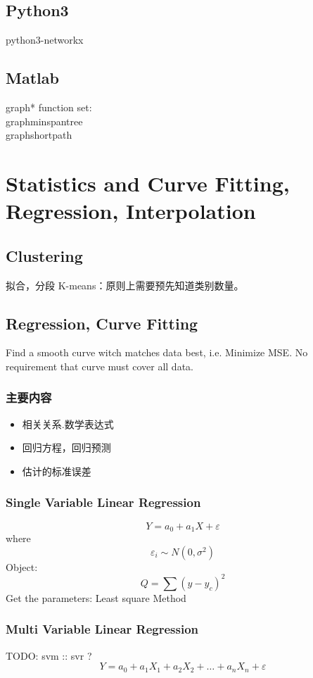 \documentclass[12pt,a4paper]{article} \usepackage{kurier}
\begin{document}
\begin{CJK}{UTF8}{gkai}
\begin{multicols}{2}
	\subsection{Python3}
		python3-networkx
	\subsection{Matlab}
		graph* function set:\\
			graphminspantree\\
			graphshortpath\\
\end{multicols}

\newpage
\section{Statistics and Curve Fitting, Regression, Interpolation}
\begin{multicols}{2}
	\subsection{Clustering}
	拟合，分段\newline
	K-means：原则上需要预先知道类别数量。
	\subsection{Regression, Curve Fitting}
		Find a smooth curve witch matches data best, i.e. Minimize MSE.
		No requirement that curve must cover all data.
		\subsubsection{主要内容}
			\begin{itemize}
			\item 相关关系.数学表达式
			\item 回归方程，回归预测
			\item 估计的标准误差
			\end{itemize}
		\subsubsection{Single Variable Linear Regression}
			\[ Y = a_0 + a_1 X + \varepsilon \] 
			where
			\[ \varepsilon_i \sim N(0,\sigma^2) \]
			Object:
			\[ Q = \sum{(y - y_c)^2} \]
			Get the parameters: Least square Method
		\subsubsection{Multi Variable Linear Regression}
			TODO: svm :: svr ?
			\[ Y = a_0 + a_1 X_1 + a_2 X_2 + \ldots + a_n X_n + \varepsilon \]

\end{multicols}
\end{CJK}
\end{document}
